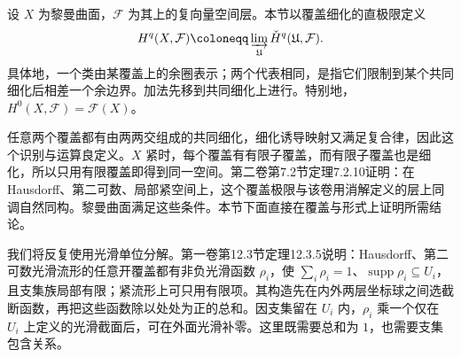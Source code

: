 \begin{definition}
\label{g4:def:0302:sheaf-cohomology}
设 \(X\) 为黎曼曲面，\(\mathcal F\) 为其上的复向量空间层。本节以覆盖细化的直极限定义
\[
 H^q(X,\mathcal F)\coloneqq
 \varinjlim_{\mathfrak U}\check H^q(\mathfrak U,\mathcal F).
\]
具体地，一个类由某覆盖上的余圈表示；两个代表相同，是指它们限制到某个共同细化后相差一个余边界。加法先移到共同细化上进行。特别地，\(H^0(X,\mathcal F)=\mathcal F(X)\)。
\end{definition}

任意两个覆盖都有由两两交组成的共同细化，细化诱导映射又满足复合律，因此这个识别与运算良定义。\(X\) 紧时，每个覆盖有有限子覆盖，而有限子覆盖也是细化，所以只用有限覆盖即得到同一空间。第二卷第7.2节定理7.2.10证明：在 Hausdorff、第二可数、局部紧空间上，这个覆盖极限与该卷用消解定义的层上同调自然同构。黎曼曲面满足这些条件。本节下面直接在覆盖与形式上证明所需结论。

\ProseParagraphBreak

我们将反复使用光滑单位分解。第一卷第12.3节定理12.3.5说明：Hausdorff、第二可数光滑流形的任意开覆盖都有非负光滑函数 \(\rho_i\)，使 \(\sum_i\rho_i=1\)、\(\operatorname{supp}\rho_i\subseteq U_i\)，且支集族局部有限；紧流形上可只用有限项。其构造先在内外两层坐标球之间选截断函数，再把这些函数除以处处为正的总和。因支集留在 \(U_i\) 内，\(\rho_i\) 乘一个仅在 \(U_i\) 上定义的光滑截面后，可在外面光滑补零。这里既需要总和为 \(1\)，也需要支集包含关系。

